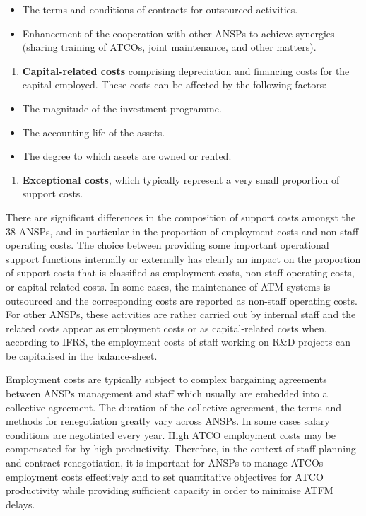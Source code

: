 \documentclass[
  11pt,
  a4paperpaper,
  openany,headsepline=on,footsepline=off,DIV=12,table]{scrbook}
\providecommand{\tightlist}{%
  \setlength{\itemsep}{0pt}\setlength{\parskip}{0pt}}\usepackage{longtable,booktabs,array}
\begin{document}
\begin{itemize}
\item
  The terms and conditions of contracts for outsourced activities.
\item
  Enhancement of the cooperation with other ANSPs to achieve synergies
  (sharing training of ATCOs, joint maintenance, and other matters).
\end{itemize}

\begin{enumerate}
\def\labelenumi{\alph{enumi})}
\setcounter{enumi}{2}
\tightlist
\item
  \textbf{Capital-related costs} comprising depreciation and financing
  costs for the capital employed. These costs can be affected by the
  following factors:
\end{enumerate}

\begin{itemize}
\item
  The magnitude of the investment programme.
\item
  The accounting life of the assets.
\item
  The degree to which assets are owned or rented.
\end{itemize}

\begin{enumerate}
\def\labelenumi{\alph{enumi})}
\setcounter{enumi}{3}
\tightlist
\item
  \textbf{Exceptional costs}, which typically represent a very small
  proportion of support costs.
\end{enumerate}

There are significant differences in the composition of support costs
amongst the 38 ANSPs, and in particular in the proportion of employment
costs and non-staff operating costs. The choice between providing some
important operational support functions internally or externally has
clearly an impact on the proportion of support costs that is classified
as employment costs, non-staff operating costs, or capital-related
costs. In some cases, the maintenance of ATM systems is outsourced and
the corresponding costs are reported as non-staff operating costs. For
other ANSPs, these activities are rather carried out by internal staff
and the related costs appear as employment costs or as capital-related
costs when, according to IFRS, the employment costs of staff working on
R\&D projects can be capitalised in the balance-sheet.

Employment costs are typically subject to complex bargaining agreements
between ANSPs management and staff which usually are embedded into a
collective agreement. The duration of the collective agreement, the
terms and methods for renegotiation greatly vary across ANSPs. In some
cases salary conditions are negotiated every year. High ATCO employment
costs may be compensated for by high productivity. Therefore, in the
context of staff planning and contract renegotiation, it is important
for ANSPs to manage ATCOs employment costs effectively and to set
quantitative objectives for ATCO productivity while providing sufficient
capacity in order to minimise ATFM delays.
\end{document}
